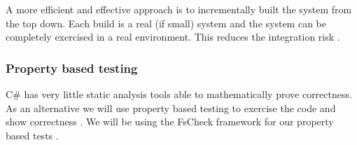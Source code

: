 A more efficient and effective approach is to incrementally built the system from
the top down. Each build is a real (if small) system and the system can be completely 
exercised in a real environment. This reduces the integration risk \parencite{CbyCPraxis}.

\subsubsection{Property based testing}
C\# has very little static analysis tools able to mathematically prove correctness.
As an alternative we will use property based testing to exercise the code and show 
correctness \parencite{QuickCheck} \parencite{Hamlet94randomtesting}. We will be
using the FsCheck framework for our property based tests \parencite{FsCheck_home}.